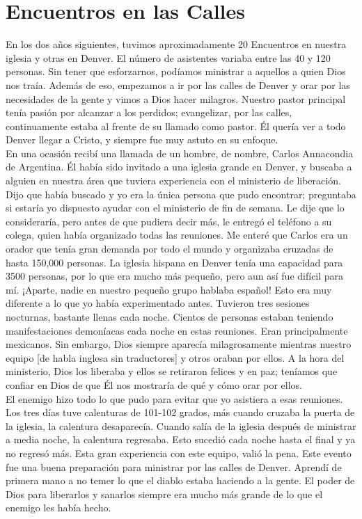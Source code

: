 \documentclass[twoside, 12pt]{book}
\begin{document}
\section{Encuentros en las Calles}

En los dos años siguientes, tuvimos aproximadamente 20 Encuentros en nuestra iglesia y otras en Denver. El número de asistentes variaba entre las 40 y 120 personas. Sin tener que esforzarnos, podíamos ministrar a aquellos a quien Dios nos traía. Además de eso, empezamos a ir por las calles de Denver y orar por las necesidades de la gente y vimos a Dios hacer milagros. Nuestro pastor principal tenía pasión por alcanzar a los perdidos; evangelizar, por las calles, continuamente estaba al frente de su llamado como pastor. Él quería ver a todo Denver llegar a Cristo, y siempre fue muy astuto en su enfoque.\\

En una ocasión recibí una llamada de un hombre, de nombre, Carlos Annacondia de Argentina. Él había sido invitado a una iglesia grande en Denver, y buscaba a alguien en nuestra área que tuviera experiencia con el ministerio de liberación. Dijo que había buscado y yo era la única persona que pudo encontrar; preguntaba si estaría yo dispuesto ayudar con el ministerio de fin de semana. Le dije que lo consideraría, pero antes de que pudiera decir más, le entregó el teléfono a su colega, quien había organizado todas las reuniones. Me enteré que Carlos era un orador que tenía gran demanda por todo el mundo y organizaba cruzadas de hasta 150,000 personas. La iglesia hispana en Denver tenía una capacidad para 3500 personas, por lo que era mucho más pequeño, pero aun así fue difícil para mí. ¡Aparte, nadie en nuestro pequeño grupo hablaba español! Esto era muy diferente a lo que yo había experimentado antes. Tuvieron tres sesiones nocturnas, bastante llenas cada noche. Cientos de personas estaban teniendo manifestaciones demoníacas cada noche en estas reuniones. Eran principalmente mexicanos. Sin embargo, Dios siempre aparecía milagrosamente mientras nuestro equipo [de habla inglesa sin traductores] y otros oraban por ellos. A la hora del ministerio, Dios los liberaba y ellos se retiraron felices y en paz; teníamos que confiar en Dios de que Él nos mostraría de qué y cómo orar por ellos.\\

El enemigo hizo todo lo que pudo para evitar que yo asistiera a esas reuniones. Los tres días tuve calenturas de 101-102 grados, más cuando cruzaba la puerta de la iglesia, la calentura desaparecía. Cuando salía de la iglesia después de ministrar a media noche, la calentura regresaba. Esto sucedió cada noche hasta el final y ya no regresó más. Esta gran experiencia con este equipo, valió la pena. Este evento fue una buena preparación para ministrar por las calles de Denver. Aprendí de primera mano a no temer lo que el diablo estaba haciendo a la gente. El poder de Dios para liberarlos y sanarlos siempre era mucho más grande de lo que el enemigo les había hecho.\\
 
\end{document}

